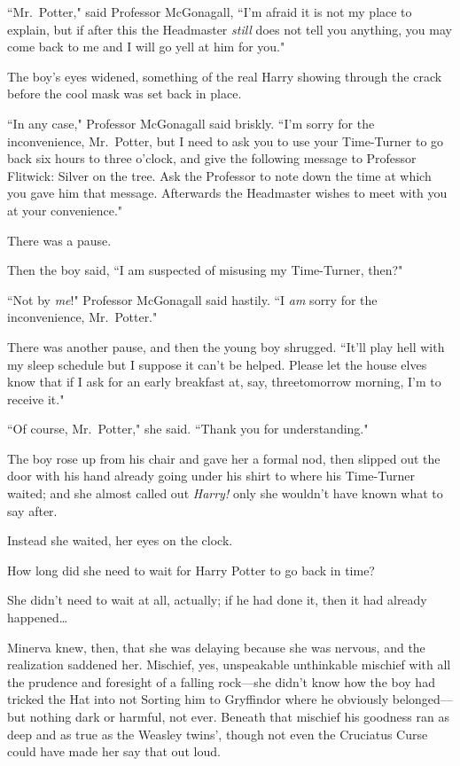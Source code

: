 ``Mr.~Potter," said Professor McGonagall, ``I'm afraid it is not my place to explain, but if after this the Headmaster \emph{still} does not tell you anything, you may come back to me and I will go yell at him for you."

The boy's eyes widened, something of the real Harry showing through the crack before the cool mask was set back in place.

``In any case," Professor McGonagall said briskly. ``I'm sorry for the inconvenience, Mr.~Potter, but I need to ask you to use your Time-Turner to go back six hours to three o'clock, and give the following message to Professor Flitwick: Silver on the tree. Ask the Professor to note down the time at which you gave him that message. Afterwards the Headmaster wishes to meet with you at your convenience."

There was a pause.

Then the boy said, ``I am suspected of misusing my Time-Turner, then?"

``Not by \emph{me}!" Professor McGonagall said hastily. ``I \emph{am} sorry for the inconvenience, Mr.~Potter."

There was another pause, and then the young boy shrugged. ``It'll play hell with my sleep schedule but I suppose it can't be helped. Please let the house elves know that if I ask for an early breakfast at, say, three\am tomorrow morning, I'm to receive it."

``Of course, Mr.~Potter," she said. ``Thank you for understanding."

The boy rose up from his chair and gave her a formal nod, then slipped out the door with his hand already going under his shirt to where his Time-Turner waited; and she almost called out \emph{Harry!} only she wouldn't have known what to say after.

Instead she waited, her eyes on the clock.

How long did she need to wait for Harry Potter to go back in time?

She didn't need to wait at all, actually; if he had done it, then it had already happened{\ldots}

Minerva knew, then, that she was delaying because she was nervous, and the realization saddened her. Mischief, yes, unspeakable unthinkable mischief with all the prudence and foresight of a falling rock---she didn't know how the boy had tricked the Hat into not Sorting him to Gryffindor where he obviously belonged---but nothing dark or harmful, not ever. Beneath that mischief his goodness ran as deep and as true as the Weasley twins', though not even the Cruciatus Curse could have made her say that out loud.

